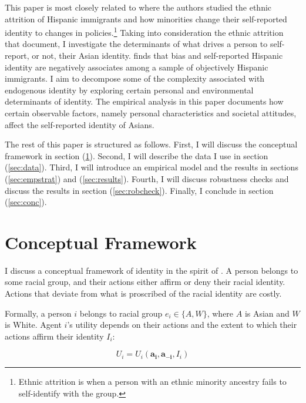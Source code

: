 This paper is most closely related to \textcite{hadah2024hispanicidentity, antmanEthnicAttritionObserved2016,antmanIncentivesIdentifyRacial2015,antmanAmericanIndianCasinos2021} where the authors studied the ethnic attrition of Hispanic immigrants and how minorities change their self-reported identity to changes in policies.\footnote{Ethnic attrition is when a person with an ethnic minority ancestry fails to self-identify with the group.} Taking into consideration the ethnic attrition that \textcite{antmanEthnicAttritionObserved2016} document, I investigate the determinants of what drives a person to self-report, or not, their Asian identity. \textcite{hadah2024hispanicidentity} finds that bias and self-reported Hispanic identity are negatively associates among a sample of objectively Hispanic immigrants. I aim to decompose some of the complexity associated with endogenous identity by exploring certain personal and environmental determinants of identity. The empirical analysis in this paper documents how certain observable factors, namely personal characteristics and societal attitudes, affect the self-reported identity of Asians.

The rest of this paper is structured as follows. First, I will discuss the conceptual framework in section (\ref{sec:model}). Second, I will describe the data I use in section (\ref{sec:data}). Third, I will introduce an empirical model and the results in sections (\ref{sec:empstrat}) and (\ref{sec:results}). Fourth, I will discuss robustness checks and discuss the results in section (\ref{sec:robcheck}). Finally, I conclude in section (\ref{sec:conc}). 

\section{Conceptual Framework}\label{sec:model}

I discuss a conceptual framework of identity in the spirit of \textcite{akerlofEconomicsIdentity2000}. A person belongs to some racial group, and their actions either affirm or deny their racial identity. Actions that deviate from what is proscribed of the racial identity are costly. 

Formally, a person $i$ belongs to racial group $e_i \in \{A, W\}$, where $A$ is Asian and $W$ is White. Agent $i$'s utility depends on their actions and the extent to which their actions affirm their identity $I_i$:

\begin{equation}
U_i = U_i(\pmb{a_i}, \pmb{a_{-i}}, I_i)\label{eq:util}
\end{equation}

